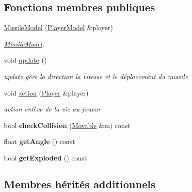 \subsection*{Fonctions membres publiques}
\begin{DoxyCompactItemize}
\item 
\hyperlink{class_missile_model_a0286d06eb77751994cf3f1f534a77e1f}{Missile\+Model} (\hyperlink{class_player_model}{Player\+Model} \&player)
\begin{DoxyCompactList}\small\item\em \hyperlink{class_missile_model}{Missile\+Model}. \end{DoxyCompactList}\item 
\hypertarget{class_missile_model_aa0a49130fcbc4420951ad00e33e69c3e}{void \hyperlink{class_missile_model_aa0a49130fcbc4420951ad00e33e69c3e}{update} ()}\label{class_missile_model_aa0a49130fcbc4420951ad00e33e69c3e}

\begin{DoxyCompactList}\small\item\em update gère la direction la vitesse et le déplacement du missile \end{DoxyCompactList}\item 
void \hyperlink{class_missile_model_adac9ac58b5807f3e223739b0ab1c1135}{action} (\hyperlink{class_player}{Player} \&player)
\begin{DoxyCompactList}\small\item\em action enlève de la vie au joueur \end{DoxyCompactList}\item 
\hypertarget{class_missile_model_a2a82d6347b93608c129a02ce1a2b9c50}{bool {\bfseries check\+Collision} (\hyperlink{class_movable}{Movable} \&m) const }\label{class_missile_model_a2a82d6347b93608c129a02ce1a2b9c50}

\item 
\hypertarget{class_missile_model_a3113026d19eaff3f61c4041bc927d54a}{float {\bfseries get\+Angle} () const }\label{class_missile_model_a3113026d19eaff3f61c4041bc927d54a}

\item 
\hypertarget{class_missile_model_aff399aa189fbaa8e8d3690fed6d7bcb0}{bool {\bfseries get\+Exploded} () const }\label{class_missile_model_aff399aa189fbaa8e8d3690fed6d7bcb0}

\end{DoxyCompactItemize}
\subsection*{Membres hérités additionnels}



